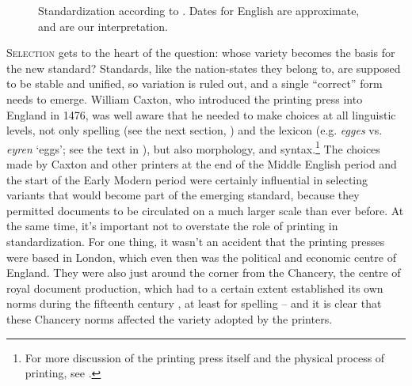 \begin{figure}
     \caption{Standardization according to \citet[933]{Haugen1966}. Dates for English are approximate, and are our interpretation.}
     \label{fig:standardization}
\end{figure}

\largerpage
\noindent \textsc{Selection} gets to the heart of the question: whose variety becomes the basis for the new standard? Standards, like the nation-states they belong to, are supposed to be stable and unified, so variation is ruled out, and a single ``correct'' form needs to emerge. William Caxton, who introduced the printing press into England in 1476, was well aware that he needed to make choices at all linguistic levels, not only spelling (see the next section, ) and the lexicon (e.g. \textit{egges} vs. \textit{eyren} `eggs'; see the text in ), but also morphology, and syntax.\footnote{For more discussion of the printing press itself and the physical process of printing, see \citet[159--162]{vanGelderen2014}.} The choices made by Caxton and other printers at the end of the Middle English period and the start of the Early Modern period were certainly influential in selecting variants that would become part of the emerging standard, because they permitted documents to be circulated on a much larger scale than ever before. At the same time, it's important not to overstate the role of printing in standardization. For one thing, it wasn't an accident that the printing presses were based in London, which even then was the political and economic centre of England. They were also just around the corner from the Chancery, the centre of royal document production, which had to a certain extent established its own norms during the fifteenth century \citep{Fisher1977}, at least for spelling -- and it is clear that these Chancery norms affected the variety adopted by the printers.


